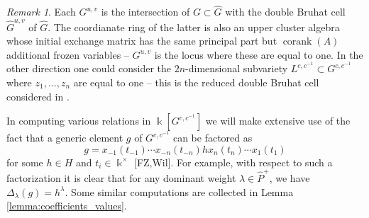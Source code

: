 \documentclass[12pt]{amsart}
\newcommand{\saySS}[1]{\say[SS]{\color{blue}{\bf SS:}\;#1}}
\newcommand{\sayDR}[1]{\say[DR]{\color{red}{\bf DR:}\;#1}}
\newcommand{\kk}{\Bbbk}%
\DeclareMathOperator{\corank}{corank}
\theoremstyle{remark}
\newtheorem{remark}[theorem]{Remark}
\numberwithin{equation}{section}
\begin{document}
\begin{remark}
Each $G^{u,v}$ is the intersection of $G \subset \widehat{G}$ with the double Bruhat cell $\widehat{G}^{u,v}$ of $\widehat{G}$. The coordianate ring of the latter is also an upper cluster algebra whose initial exchange matrix has the same principal part but $\corank(A)$ additional frozen variables -- $G^{u,v}$ is the locus where these are equal to one. In the other direction one could consider the $2n$-dimensional subvariety $L^{c,c^{-1}} \subset G^{c,c^{-1}}$ where $z_1,\dotsc,z_n$ are equal to one -- this is the reduced double Bruhat cell considered in \cite{YZ08}.
\end{remark}

In computing various relations in $\kk[G^{c,c^{-1}}]$ we will make extensive use of the fact that a generic element $g$ of $G^{c,c^{-1}}$ can be factored as
\begin{equation}
  \label{eq:generic_element}
  g=x_{-1}(t_{-1}) \cdots x_{-n}(t_{-n}) h x_n(t_n) \cdots x_1(t_1)
\end{equation}
for some $h \in H$ and $t_i \in \kk^\times$ [FZ,Wil]. 
For example, with respect to such a factorization it is clear that for any dominant weight $\lambda \in \widehat{P}^+$, we have $\Delta_\lambda(g) = h^\lambda$. %
Some similar computations are collected in Lemma \ref{lemma:coefficients_values}. 

\end{document}
